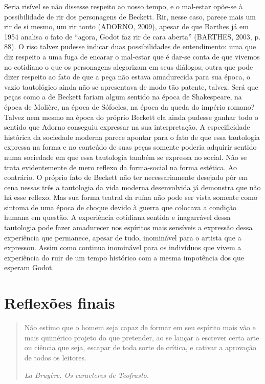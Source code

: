 Seria risível se não dissesse respeito ao nosso tempo, e o mal-estar
opõe-se à possibilidade de rir dos personagens de Beckett. Rir, nesse
caso, parece mais um rir de si mesmo, um rir tonto (ADORNO, 2009),
apesar de que Barthes já em 1954 analisa o fato de ``agora, Godot faz
rir de cara aberta'' (BARTHES, 2003, p. 88). O riso talvez pudesse
indicar duas possibilidades de entendimento: uma que diz respeito a uma
fuga de encarar o mal-estar que é dar-se conta de que vivemos no
cotidiano o que os personagens alegorizam em seus diálogos; outra que
pode dizer respeito ao fato de que a peça não estava amadurecida para
sua época, o vazio tautológico ainda não se apresentava de modo tão
patente, talvez. Será que peças como a de Beckett fariam algum sentido
na época de Shakespeare, na época de Molière, na época de Sófocles, na
época da queda do império romano? Talvez nem mesmo na época do próprio
Beckett ela ainda pudesse ganhar todo o sentido que Adorno conseguiu
expressar na sua interpretação. A especificidade histórica da sociedade
moderna parece apontar para o fato de que essa tautologia expressa na
forma e no conteúdo de suas peças somente poderia adquirir sentido numa
sociedade em que essa tautologia também se expressa no social. Não se
trata evidentemente de mero reflexo da forma-social na forma estética.
Ao contrário. O próprio fato de Beckett não ter necessariamente desejado
pôr em cena nessas três a tautologia da vida moderna desenvolvida já
demonstra que não há esse reflexo. Mas sua forma teatral da ruína não
pode ser vista somente como sintoma de uma época de choque devido à
guerra que colocava a condição humana em questão. A experiência
cotidiana sentida e inagarrável dessa tautologia pode fazer amadurecer
nos espíritos mais sensíveis a expressão dessa experiência que
permanece, apesar de tudo, inominável para o artista que a expressou.
Assim como continua inominável para os indivíduos que vivem a
experiência do ruir de um tempo histórico com a mesma impotência dos que
esperam Godot.

\chapter{Reflexões finais}

\begin{quote}
Não estimo que o homem seja capaz de formar em seu espírito mais vão e
mais quimérico projeto do que pretender, ao se lançar a escrever certa
arte ou ciência que seja, escapar de toda sorte de crítica, e cativar a
aprovação de todos os leitores.

\emph{La Bruyère. Os caracteres de Teofrasto.}
\end{quote}

